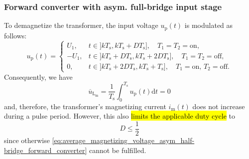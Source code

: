 \begin{frame}
	\frametitle{Forward converter with asym. full-bridge input stage}
	To demagnetize the transformer, the input voltage $u_\mathrm{p}(t)$ is modulated as follows:
	\begin{equation}
		u_\mathrm{p}(t) = \begin{cases}
			U_1,  & t\in]kT_\mathrm{s}, kT_\mathrm{s}+D T_\mathrm{s}], \quad T_1=T_2=\mathrm{on},                               \\
			-U_1, & t\in]kT_\mathrm{s}+D T_\mathrm{s}, kT_\mathrm{s}+2D T_\mathrm{s}], \quad  T_1=T_2=\mathrm{off},             \\
			0,    & t\in]kT_\mathrm{s}+2D T_\mathrm{s}, kT_\mathrm{s}+T_\mathrm{s}], \quad T_1=\mathrm{on},\, T_2=\mathrm{off}.
		\end{cases}
	\end{equation}\pause
	Consequently, we have
	\begin{equation}
		\overline{u}_\mathrm{L_\mathrm{m}} = \frac{1}{T_\mathrm{s}}\int_{0}^{T_\mathrm{s}}u_\mathrm{p}(t)\mathrm{d}t = 0
		\label{eq:average_magnetizing_voltage_asym_half-bridge_forward_converter}
	\end{equation}
	and, therefore, the transformer's magnetizing current $i_\mathrm{m}(t)$ does not increase during a pulse period. \pause However, this also \hl{limits the applicable duty cycle} to
	$$
		D\leq\frac{1}{2}
	$$
	since otherwise \eqref{eq:average_magnetizing_voltage_asym_half-bridge_forward_converter} cannot be fulfilled.
\end{frame}

